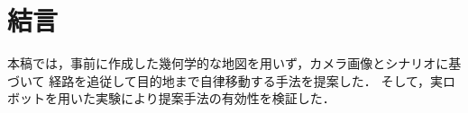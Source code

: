\documentclass{sice-si}
\begin{document}
\section{結言}
本稿では，事前に作成した幾何学的な地図を用いず，カメラ画像とシナリオに基づいて
経路を追従して目的地まで自律移動する手法を提案した．
そして，実ロボットを用いた実験により提案手法の有効性を検証した．
\end{document}
